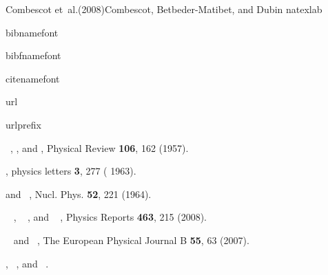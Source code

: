 \documentclass[aps,prb,superscriptaddress,twocolumn]{revtex4}
\begin{document}
\begin{thebibliography}{Combescot et~al.(2008)Combescot, Betbeder-Matibet,
and Dubin}
\bibitem{} \expandafter\ifx\csname natexlab\endcsname\relax

\fi
\expandafter\ifx\csname bibnamefont\endcsname\relax

\fi
\expandafter\ifx\csname bibfnamefont\endcsname\relax

\fi
\expandafter\ifx\csname citenamefont\endcsname\relax

\fi
\expandafter\ifx\csname url\endcsname\relax

\fi
\expandafter\ifx\csname urlprefix\endcsname\relax

\fi
\providecommand{\bibinfo}[2]{#2} \providecommand{\eprint}[2][]{\url{#2}}

\bibinfo{author}{~},  %
\bibinfo{author}{ },  and 
\bibinfo{author}{
  }, \bibinfo{journal}{Physical Review}  \textbf{%
\bibinfo{volume}{106}}, \bibinfo{pages}{162} (\bibinfo{year}{1957}).

 \bibinfo{author}{%
 },  \bibinfo{journal}{physics
letters} \textbf{\bibinfo{volume}{3}},  \bibinfo{pages}{277} (%
\bibinfo{year}{1963}).

 \bibinfo{author}{%
 }  and \bibinfo{author}{%
~},  \bibinfo{journal}{Nucl. Phys.} 
\textbf{\bibinfo{volume}{52}},  \bibinfo{pages}{221} (\bibinfo{year}{1964}).

 \bibinfo{author}{~%
},  \bibinfo{author}{~%
},  and \bibinfo{author}{~%
},  \bibinfo{journal}{Physics Reports} \textbf{%
\bibinfo{volume}{463}},  \bibinfo{pages}{215} (\bibinfo{year}{2008}).

\bibinfo{author}{~} and  %
\bibinfo{author}{~},  %
\bibinfo{journal}{The European Physical Journal B}  \textbf{%
\bibinfo{volume}{55}}, \bibinfo{pages}{63} (\bibinfo{year}{2007}).

\bibinfo{author}{ }, %
\bibinfo{author}{~}, and %
\bibinfo{author}{\bibfnamefont{M.}~}.
\end{thebibliography}
\end{document}
